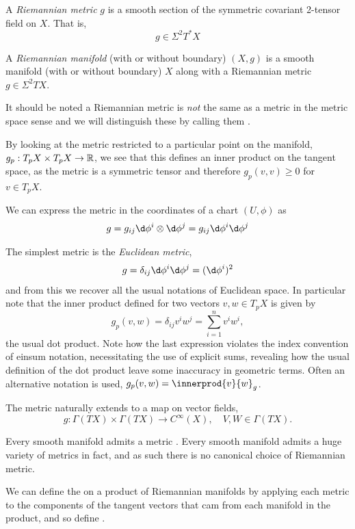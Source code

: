 \begin{definition}
	A \emph{Riemannian metric} \(g\) is a smooth section of the symmetric covariant 2-tensor field on \(X\).
	That is,
	\[g\in \Sigma^2 T^*X \]
\end{definition}
\begin{definition}
	\label{def:riemannain_manifold}
	A \emph{Riemannian manifold} (with or without boundary) \((X, g)\) is a smooth manifold (with or without boundary) \(X\) along with a Riemannian metric \(g\in \Sigma^2 TX\).
\end{definition}
It should be noted a Riemannian metric is \emph{not} the same as a metric in the metric space sense and we will distinguish these by calling them .

By looking at the metric restricted to a particular point on the manifold, \(g_p: T_pX\times T_pX \to \mathbb{R}\), we see that this defines an inner product on the tangent space, as the metric is a symmetric tensor and therefore \(g_p(v, v) \geq 0\) for \(v \in T_pX\).

We can express the metric in the coordinates of a chart \((U, \phi)\) as 
\[g = g_{ij}\d\phi^i \otimes \d\phi^j = g_{ij} \d\phi^i\d\phi^j\]

The simplest metric is the \emph{Euclidean metric},
\[g = \delta_{ij}\d\phi^i\d\phi^j = (\d\phi^i)^2\]
and from this we recover all the usual notations of Euclidean space.
In particular note that the inner product defined for two vectors \(v, w\in T_pX\) is given by
\[g_p(v, w) = \delta_{ij} v^i w^j = \sum_{i=1}^n v^i w^i,\] the usual dot product.
Note how the last expression violates the index convention of einsum notation, necessitating the use of explicit sums, revealing how the usual definition of the dot product leave some inaccuracy in geometric terms.
Often an alternative notation is used, \(g_p(v, w) = \innerprod{v}{w}_g\).

The metric naturally extends to a map on vector fields, 
\[
	g: \Gamma(TX) \times \Gamma(TX) \to C^\infty(X), \quad V, W \in \Gamma(TX).	
\] 

Every smooth manifold admits a metric \parencite[proposition 13.3]{lee2013smooth}.
Every smooth manifold admits a huge variety of metrics in fact, and as such there is no canonical choice of Riemannian metric. 

We can define the  on a product of Riemannian manifolds by applying each metric to the components of the tangent vectors that cam from each manifold in the product, and so define .

